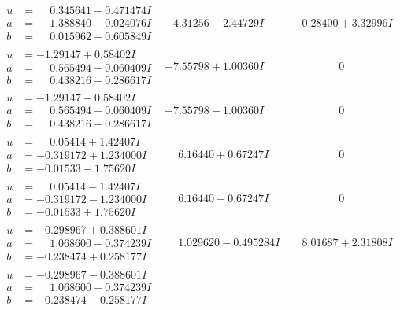 \documentclass[1p]{elsarticle_modified}
\theoremstyle{definition}
\begin{document}
$$\begin{array}{c|c|c}
\begin{aligned}
u &= \phantom{-}0.345641 - 0.471474 I \\
a &= \phantom{-}1.388840 + 0.024076 I \\
b &= \phantom{-}0.015962 + 0.605849 I\end{aligned}
 & -4.31256 - 2.44729 I & \phantom{-}0.28400 + 3.32996 I \\ \hline\begin{aligned}
u &= -1.29147 + 0.58402 I \\
a &= \phantom{-}0.565494 - 0.060409 I \\
b &= \phantom{-}0.438216 - 0.286617 I\end{aligned}
 & -7.55798 + 1.00360 I & \phantom{-0.000000 } 0 \\ \hline\begin{aligned}
u &= -1.29147 - 0.58402 I \\
a &= \phantom{-}0.565494 + 0.060409 I \\
b &= \phantom{-}0.438216 + 0.286617 I\end{aligned}
 & -7.55798 - 1.00360 I & \phantom{-0.000000 } 0 \\ \hline\begin{aligned}
u &= \phantom{-}0.05414 + 1.42407 I \\
a &= -0.319172 + 1.234000 I \\
b &= -0.01533 - 1.75620 I\end{aligned}
 & \phantom{-}6.16440 + 0.67247 I & \phantom{-0.000000 } 0 \\ \hline\begin{aligned}
u &= \phantom{-}0.05414 - 1.42407 I \\
a &= -0.319172 - 1.234000 I \\
b &= -0.01533 + 1.75620 I\end{aligned}
 & \phantom{-}6.16440 - 0.67247 I & \phantom{-0.000000 } 0 \\ \hline\begin{aligned}
u &= -0.298967 + 0.388601 I \\
a &= \phantom{-}1.068600 + 0.374239 I \\
b &= -0.238474 + 0.258177 I\end{aligned}
 & \phantom{-}1.029620 - 0.495284 I & \phantom{-}8.01687 + 2.31808 I \\ \hline\begin{aligned}
u &= -0.298967 - 0.388601 I \\
a &= \phantom{-}1.068600 - 0.374239 I \\
b &= -0.238474 - 0.258177 I\end{aligned}

\end{array}$$
\end{document}

